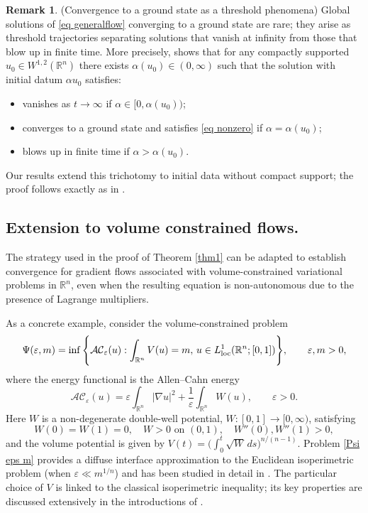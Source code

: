 \documentclass[11pt,letterpaper,reqno]{amsart}
\newcommand{\R}{\mathbb{R}}
\newcommand{\e}{\varepsilon}
\theoremstyle{plain}%
\theoremstyle{definition}
\newtheorem{remark}[theorem]{Remark}
\numberwithin{equation}{section}
\numberwithin{figure}{section}
\begin{document}
\begin{remark}\label{reramrk convergence}(Convergence to a ground state as a threshold phenomena)   	 
	 Global solutions of \eqref{eq generalflow} converging to a ground state are rare; they arise as threshold trajectories separating solutions that vanish at infinity from those that blow up in finite time. More precisely, \cite[Theorem 1.1]{feireisl1997threshold} shows that for any compactly supported $u_0 \in W^{1,2}(\R^n)$ there exists $\alpha(u_0) \in (0,\infty)$ such that the solution with initial datum $\alpha u_0$ satisfies:
\begin{itemize}
\item vanishes as $t\to \infty$ if $\alpha \in [0,\alpha(u_0))$;
\item converges to a ground state and satisfies \eqref{eq nonzero} if $\alpha = \alpha(u_0)$;
\item blows up in finite time if $\alpha > \alpha(u_0)$.
\end{itemize}
Our results extend this trichotomy to initial data without compact support; the proof follows exactly as in \cite{feireisl1997threshold}.
\end{remark}

\subsection{Extension to volume constrained flows.} The strategy used in the proof of Theorem \ref{thm1} can be adapted to establish convergence for gradient flows associated with volume-constrained variational problems in $\R^n$, even when the resulting equation is non-autonomous due to the presence of Lagrange multipliers. 

As a concrete example, consider the volume-constrained problem
\begin{equation}
\label{Psi eps m}
\Psi(\varepsilon,m) = \inf \Bigg\{\mathcal{AC}_\e(u): \int_{\R^n} V(u) = m, \, u \in L^1_{\rm loc}(\R^n;[0,1]) \Bigg\}, \qquad \varepsilon, m>0,
\end{equation}
where the energy functional is the Allen--Cahn energy
\begin{equation}
\label{AC eps}
\mathcal{AC}_\e(u) = \varepsilon \int_{\R^n} |\nabla u|^2 + \frac{1}{\varepsilon} \int_{\R^n} W(u), \qquad \varepsilon>0.
\end{equation}
Here $W$ is a non-degenerate double-well potential, $W:[0,1] \to [0,\infty)$, satisfying
\begin{equation}\label{eq usualW}
W(0)=W(1)=0, \quad W>0 \text{ on } (0,1), \quad W''(0), W''(1) >0,
\end{equation}
and the volume potential is given by $V(t) = \big(\int_0^t \sqrt{W}\,ds \big)^{n/(n-1)}$. Problem \eqref{Psi eps m} provides a diffuse interface approximation to the Euclidean isoperimetric problem (when $\varepsilon \ll m^{1/n}$) and has been studied in detail in \cite{maggi2024uniform}. The particular choice of $V$ is linked to the classical isoperimetric inequality; its key properties are discussed extensively in the introductions of \cite{maggi2024uniform, bonforte2024asymptotic}.  
\end{document}
